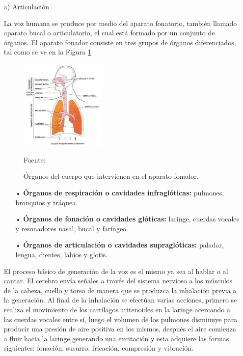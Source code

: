 \begin{enumerate}
\item[a)]Articulación
\par
La voz humana se produce por medio del aparato fonatorio, también llamado aparato bucal o articulatorio, el cual está formado por un conjunto de órganos. El aparato fonador consiste en tres grupos de órganos diferenciados, tal como se ve en la Figura \ref{fig:figura2.1}

\begin{figure}[ht]
\begin{center}
\includegraphics[width=0.4\textwidth]{Imagenes/Cap2/image001}
\end{center}
\begin{center}
\vskip -0.5cm
\caption{\small{Órganos del cuerpo que intervienen en el aparato fonador.}}
\label{fig:figura2.1}
{\small{Fuente: \cite{luis}}}
\end{center}
\end{figure}
\newpage
\begin{enumerate}
\item[•]\textbf{Órganos de respiración o cavidades infraglóticas:} pulmones, bronquios y tráquea.
\item[•]\textbf{Órganos de fonación o cavidades glóticas:} laringe, cuerdas vocales y resonadores nasal, bucal y faríngeo.
\item[•]\textbf{Órganos de articulación o cavidades supraglóticas:} paladar, lengua, dientes, labios y glotis.
\end{enumerate}

\par
El proceso básico de generación de la voz es el mismo ya sea al hablar o al cantar. El cerebro envía señales a través del sistema nervioso a los músculos de la cabeza, cuello y torso de manera que se produzca la inhalación previa a la generación. Al final de la inhalación se efectúan varias acciones, primero se realiza el movimiento de los cartílagos aritenoides en la laringe acercando a las cuerdas vocales entre sí, luego el volumen de los pulmones disminuye para producir una presión de aire positiva en los mismos, después el aire comienza a fluir hacia la laringe generando una excitación y esta adquiere las formas siguientes: fonación, susurro, fricación, compresión y vibración.


\end{enumerate}
